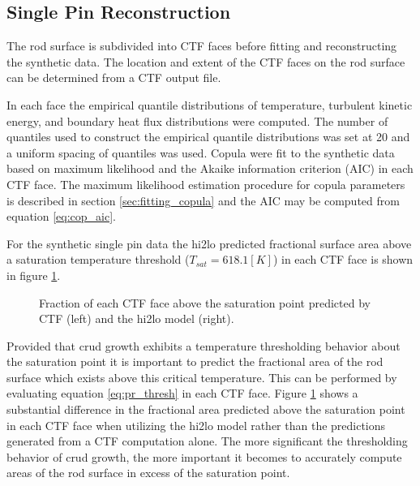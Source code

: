 \subsection{Single Pin Reconstruction}

The rod surface is subdivided into CTF faces before fitting and reconstructing the synthetic data.  The location and extent of the CTF faces on the rod surface can be determined from a CTF output file.  

In each face the empirical quantile distributions of temperature, turbulent kinetic energy, and boundary heat flux distributions were computed.  The number of quantiles used to construct the empirical quantile distributions was set at 20 and a uniform spacing of quantiles was used.  Copula were fit to the synthetic data based on maximum likelihood and the Akaike information criterion (AIC) in each CTF face.  The maximum likelihood estimation procedure for copula parameters is described in section \ref{sec:fitting_copula} and the AIC may be computed from equation \ref{eq:cop_aic}.

For the synthetic single pin data the hi2lo predicted fractional surface area above a saturation temperature threshold ($T_{sat}=618.1[K]$) in each CTF face is shown in figure \ref{fig:frac_a}.

\begin{figure}[H]%
    \centering
    \qquad
    \caption[]{Fraction of each CTF face above the saturation point predicted by CTF (left) and the hi2lo model (right).}%
    \label{fig:frac_a}%
\end{figure}

Provided that crud growth exhibits a temperature thresholding behavior about the saturation point it is important to predict the fractional area of the rod surface which exists above this critical temperature.  This can be performed by evaluating equation \ref{eq:pr_thresh} in each CTF face. Figure \ref{fig:frac_a} shows a substantial difference in the fractional area predicted above the saturation point in each CTF face when utilizing the hi2lo model rather than the predictions generated from a CTF computation alone.  The more significant the thresholding behavior of crud growth, the more important it becomes to accurately compute areas of the rod surface in excess of the saturation point.

